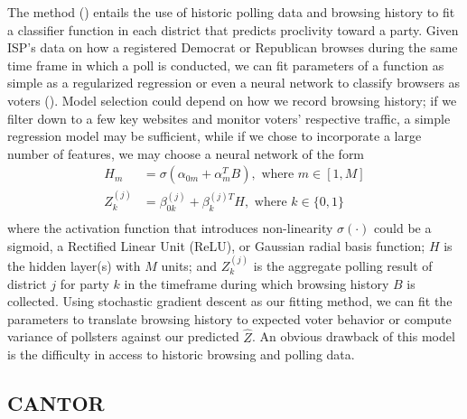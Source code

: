 \documentclass[12pt, letterpaper]{article}
\begin{document}
The method () entails the use of historic polling data and browsing history to fit a classifier function in each district that predicts proclivity toward a party. Given ISP's data on how a registered Democrat or Republican browses during the same time frame in which a poll is conducted, we can fit parameters of a function as simple as a regularized regression or even a neural network to classify browsers as voters (). Model selection could depend on how we record browsing history; if we filter down to a few key websites and monitor voters' respective traffic, a simple regression model may be sufficient, while if we chose to incorporate a large number of features, we may choose a neural network of the form
\begin{align*}
H_m &= \sigma(\alpha_{0m} + \alpha_m^TB), \text{\ where \ } m \in [1,M]\\
Z_{k}^{(j)} &= \beta_{0k}^{(j)} + \beta_k^{(j)T}H, \text{\ where \ } k \in \{0, 1\}\\
\end{align*}
where the activation function that introduces non-linearity $\sigma(\cdot)$ could be a sigmoid, a Rectified Linear Unit (ReLU), or Gaussian radial basis function; $H$ is the hidden layer(s) with $M$ units; and $Z_k^{(j)}$ is the aggregate polling result of district $j$ for party $k$ in the timeframe during which browsing history $B$ is collected. Using stochastic gradient descent as our fitting method, we can fit the parameters to translate browsing history to expected voter behavior or compute variance of pollsters against our predicted $\hat{Z}$. An obvious drawback of this model is the difficulty in access to historic browsing and polling data.

\subsection{CANTOR}



\end{document}
